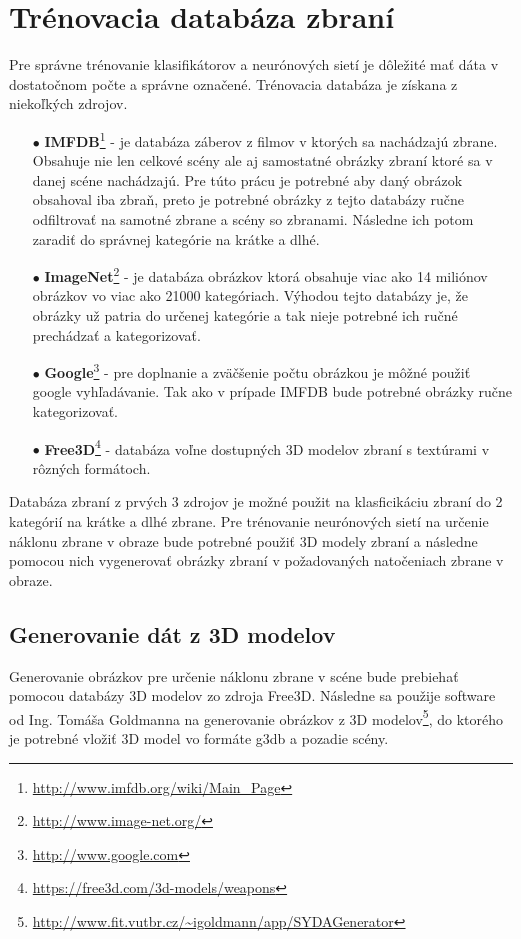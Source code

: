 
\section{Trénovacia databáza zbraní}
\label{sec:databaza}
Pre správne trénovanie klasifikátorov a neurónových sietí je dôležité mať dáta v dostatočnom počte a správne označené.
Trénovacia databáza je získana z niekoľkých zdrojov.
\begin{enumerate}
    \item[$\bullet$] \textbf{IMFDB}\footnote{\url{http://www.imfdb.org/wiki/Main_Page}} - je databáza záberov z filmov v ktorých sa nachádzajú zbrane.
    Obsahuje nie len celkové scény ale aj samostatné obrázky zbraní ktoré sa v danej scéne nachádzajú.
    Pre túto prácu je potrebné aby daný obrázok obsahoval iba zbraň, preto je potrebné obrázky z tejto databázy ručne odfiltrovať na samotné zbrane a scény so zbranami.
    Následne ich potom zaradiť do správnej kategórie na krátke a dlhé.
    \item[$\bullet$] \textbf{ImageNet}\footnote{\url{http://www.image-net.org/}} - je databáza obrázkov ktorá obsahuje viac ako 14 miliónov obrázkov vo viac ako 21000 kategóriach.
    Výhodou tejto databázy je, že obrázky už patria do určenej kategórie a tak nieje potrebné ich ručné prechádzať a kategorizovať.
    \item[$\bullet$] \textbf{Google}\footnote{\url{http://www.google.com}} - pre doplnanie a zväčšenie počtu obrázkou je môžné použiť google vyhľadávanie.
    Tak ako v prípade IMFDB bude potrebné obrázky ručne kategorizovať.
    \item[$\bullet$] \textbf{Free3D}\footnote{\url{https://free3d.com/3d-models/weapons}} - databáza voľne dostupných 3D modelov zbraní s textúrami v rôzných formátoch.
\end{enumerate}

Databáza zbraní z prvých 3 zdrojov je možné použit na klasficikáciu zbraní do 2 kategórií na krátke a dlhé zbrane.
Pre trénovanie neurónových sietí na určenie náklonu zbrane v obraze bude potrebné použiť 3D modely zbraní a následne pomocou nich vygenerovať
    obrázky zbraní v požadovaných natočeniach zbrane v obraze.

\subsection{Generovanie dát z 3D modelov}
\label{subsec:generovanie3d}
Generovanie obrázkov pre určenie náklonu zbrane v scéne bude prebiehať pomocou databázy 3D modelov zo zdroja Free3D.
Následne sa použije software od Ing. Tomáša Goldmanna na generovanie obrázkov z 3D modelov\footnote{\url{http://www.fit.vutbr.cz/~igoldmann/app/SYDAGenerator}},
    do ktorého je potrebné vložiť 3D model vo formáte g3db a pozadie scény.

